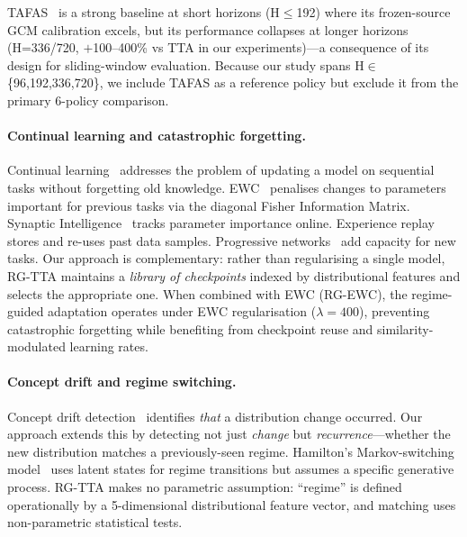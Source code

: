 \documentclass[journal]{IEEEtran}
\begin{document}
TAFAS~\cite{kim2025tafas} is a strong baseline at short horizons (H$\leq$192) where its frozen-source GCM calibration excels, but its performance collapses at longer horizons (H=336/720, $+$100--400\% vs TTA in our experiments)---a consequence of its design for sliding-window evaluation. Because our study spans H$\in$\{96,192,336,720\}, we include TAFAS as a reference policy but exclude it from the primary 6-policy comparison.

\paragraph{Continual learning and catastrophic forgetting.}
Continual learning~\cite{parisi2019continual,mccloskey1989catastrophic} addresses the problem of updating a model on sequential tasks without forgetting old knowledge. EWC~\cite{kirkpatrick2017ewc} penalises changes to parameters important for previous tasks via the diagonal Fisher Information Matrix. Synaptic Intelligence~\cite{zenke2017continual} tracks parameter importance online. Experience replay~\cite{rolnick2019experience} stores and re-uses past data samples. Progressive networks~\cite{rusu2016progressive} add capacity for new tasks. Our approach is complementary: rather than regularising a single model, RG-TTA maintains a \emph{library of checkpoints} indexed by distributional features and selects the appropriate one. When combined with EWC (RG-EWC), the regime-guided adaptation operates under EWC regularisation ($\lambda = 400$), preventing catastrophic forgetting while benefiting from checkpoint reuse and similarity-modulated learning rates.

\paragraph{Concept drift and regime switching.}
Concept drift detection~\cite{gama2014concept,lu2018concept,aminikhanghahi2017survey} identifies \emph{that} a distribution change occurred. Our approach extends this by detecting not just \emph{change} but \emph{recurrence}---whether the new distribution matches a previously-seen regime. Hamilton's Markov-switching model~\cite{hamilton1989} uses latent states for regime transitions but assumes a specific generative process. RG-TTA makes no parametric assumption: ``regime'' is defined operationally by a 5-dimensional distributional feature vector, and matching uses non-parametric statistical tests.
\end{document}
